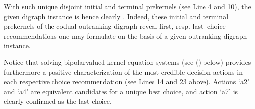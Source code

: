 \documentclass[a4paper,12pt,english]{sphinxhowto}
\begin{document}
\sphinxAtStartPar
With such unique disjoint initial and terminal prekernels (see Line 4 and 10), the given digraph instance is hence clearly . Indeed, these initial and terminal prekernels of the codual outranking digraph reveal first, resp. last, choice recommendations one may formulate on the basis of a given outranking digraph instance.

\begin{sphinxVerbatim}[commandchars=\\\{\},numbers=left,firstnumber=1,stepnumber=1]
\end{sphinxVerbatim}

\sphinxAtStartPar
Notice that solving bipolar\sphinxhyphen{}valued kernel equation systems (see {\hyperref[\detokenize{pearls:bipolar-valued-kernels-tutorial-label}]{}} () below) provides furthermore a positive characterization of the most credible decision actions in each respective choice recommendation (see Lines 14 and 23 above). Actions ‘a2’ and ‘a4’ are equivalent candidates for a unique best choice, and action ‘a7’ is clearly confirmed as the last choice.
\end{document}

